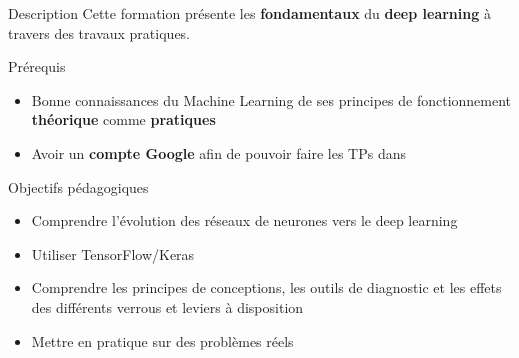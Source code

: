 
\begin{frame}{Description}
  Cette formation présente les \textbf{fondamentaux} du \textbf{deep learning} à travers des travaux pratiques.
\end{frame}

\begin{frame}{Prérequis}
  \begin{itemize}
  \item Bonne connaissances du Machine Learning de ses principes de fonctionnement \textbf{théorique} comme \textbf{pratiques}
  \item Avoir un \textbf{compte Google} afin de pouvoir faire les TPs dans 
  \end{itemize}
\end{frame}

\begin{frame}{Objectifs pédagogiques}
  \begin{itemize}
  \item Comprendre l'évolution des réseaux de neurones vers le deep learning
  \item Utiliser TensorFlow/Keras
  \item Comprendre les principes de conceptions, les outils de diagnostic et les effets des différents verrous et leviers à disposition
  \item Mettre en pratique sur des problèmes réels
  \end{itemize}
\end{frame}
